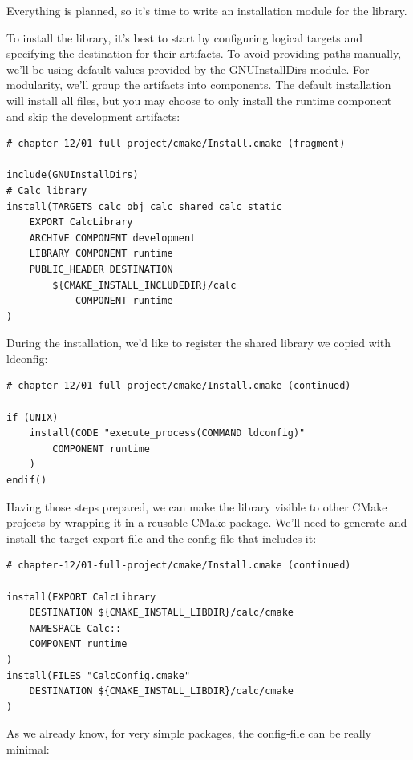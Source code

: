Everything is planned, so it's time to write an installation module for the library.


To install the library, it's best to start by configuring logical targets and specifying the destination for their artifacts. To avoid providing paths manually, we'll be using default values provided by the GNUInstallDirs module. For modularity, we'll group the artifacts into components. The default installation will install all files, but you may choose to only install the runtime component and skip the development artifacts:

\begin{lstlisting}[style=styleCMake]
# chapter-12/01-full-project/cmake/Install.cmake (fragment)

include(GNUInstallDirs)
# Calc library
install(TARGETS calc_obj calc_shared calc_static
	EXPORT CalcLibrary
	ARCHIVE COMPONENT development
	LIBRARY COMPONENT runtime
	PUBLIC_HEADER DESTINATION
		${CMAKE_INSTALL_INCLUDEDIR}/calc
			COMPONENT runtime
)
\end{lstlisting}

During the installation, we'd like to register the shared library we copied with ldconfig:

\begin{lstlisting}[style=styleCMake]
# chapter-12/01-full-project/cmake/Install.cmake (continued)

if (UNIX)
	install(CODE "execute_process(COMMAND ldconfig)"
		COMPONENT runtime
	)
endif()
\end{lstlisting}

Having those steps prepared, we can make the library visible to other CMake projects by wrapping it in a reusable CMake package. We'll need to generate and install the target export file and the config-file that includes it:

\begin{lstlisting}[style=styleCMake]
# chapter-12/01-full-project/cmake/Install.cmake (continued)

install(EXPORT CalcLibrary
	DESTINATION ${CMAKE_INSTALL_LIBDIR}/calc/cmake
	NAMESPACE Calc::
	COMPONENT runtime
)
install(FILES "CalcConfig.cmake"
	DESTINATION ${CMAKE_INSTALL_LIBDIR}/calc/cmake
)
\end{lstlisting}

As we already know, for very simple packages, the config-file can be really minimal:

